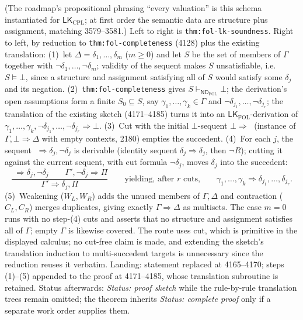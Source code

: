(The roadmap's propositional phrasing ``every valuation'' is this schema
instantiated for \(\mathsf{LK}_{\mathrm{CPL}}\); at first order the semantic
data are structure plus assignment, matching 3579--3581.)  Left to right is
\texttt{thm:fol-lk-soundness}.  Right to left, by reduction to
\texttt{thm:fol-completeness} (4128) plus the existing translation:
(1)~let \(\Delta=\delta_1,\ldots,\delta_m\) (\(m\ge 0\)) and let \(S\) be the
set of members of \(\Gamma\) together with
\(\neg\delta_1,\ldots,\neg\delta_m\); validity of the sequent makes \(S\)
unsatisfiable, i.e.\ \(S\models\bot\), since a structure and assignment
satisfying all of \(S\) would satisfy some \(\delta_j\) and its negation.
(2)~\texttt{thm:fol-completeness} gives
\(S\vdash_{\mathsf{ND}_{\mathrm{FOL}}}\bot\); the derivation's open assumptions
form a finite \(S_0\subseteq S\), say \(\gamma_1,\ldots,\gamma_k\in\Gamma\)
and \(\neg\delta_{j_1},\ldots,\neg\delta_{j_r}\); the translation of the
existing sketch (4171--4185) turns it into an
\(\mathsf{LK}_{\mathrm{FOL}}\)-derivation of
\(\gamma_1,\ldots,\gamma_k,\neg\delta_{j_1},\ldots,\neg\delta_{j_r}
\Rightarrow\bot\).
(3)~Cut with the initial \(\bot\)-sequent \(\bot\Rightarrow\;\) (instance of
\(\Gamma,\bot\Rightarrow\Delta\) with empty contexts, 2180) empties the
succedent.
(4)~For each \(j\), the sequent \(\;\Rightarrow\delta_j,\neg\delta_j\) is
derivable (identity sequent \(\delta_j\Rightarrow\delta_j\), then \(\neg R\));
cutting it against the current sequent, with cut formula \(\neg\delta_j\),
moves \(\delta_j\) into the succedent:
\[
 \frac{\;\Rightarrow\delta_j,\neg\delta_j
 \qquad \Gamma',\neg\delta_j\Rightarrow\Pi}
 {\Gamma'\Rightarrow\delta_j,\Pi}
 \qquad\text{yielding, after }r\text{ cuts,}\qquad
 \gamma_1,\ldots,\gamma_k\Rightarrow\delta_{j_1},\ldots,\delta_{j_r}.
\]
(5)~Weakening (\(W_L,W_R\)) adds the unused members of \(\Gamma,\Delta\) and
contraction (\(C_L,C_R\)) merges duplicates, giving exactly
\(\Gamma\Rightarrow\Delta\) as multisets.  The case \(m=0\) runs with no
step-(4) cuts and asserts that no structure and assignment satisfies all of
\(\Gamma\); empty \(\Gamma\) is likewise covered.  The route uses cut, which is
primitive in the displayed calculus; no cut-free claim is made, and extending
the sketch's translation induction to multi-succedent targets is unnecessary
since the reduction reuses it verbatim.  Landing: statement replaced at
4165--4170; steps (1)--(5) appended to the proof at 4171--4185, whose
translation subroutine is retained.  Status afterwards: \textit{Status: proof
sketch} while the rule-by-rule translation trees remain omitted; the theorem
inherits \textit{Status: complete proof} only if a separate work order supplies
them.

